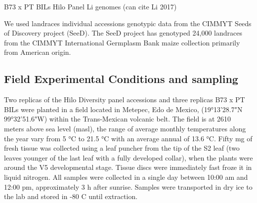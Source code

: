 \documentclass[9pt,twocolumn,twoside,lineno]{gsajnl}
\begin{document}
B73 x PT BILs
Hilo Panel
Li genomes (can cite Li 2017)

We used landraces individual accessions genotypic data from the CIMMYT Seeds of Discovery project (SeeD). The SeeD project has genotyped 24,000 landraces from the  CIMMYT International Germplasm Bank maize collection primarily from American origin.


\subsection{Field Experimental Conditions and sampling} 
Two replicas of the Hilo Diversity panel accessions and three replicas B73 x PT BILs were planted in a field located in Metepec, Edo de Mexico, (19°13'28.7"N 99°32'51.6"W) within the Trans-Mexican volcanic belt. 
The field is at 2610 meters above sea level (masl), the range of average monthly temperatures along the year vary from 5 °C to 21.5 °C with an average annual of 13.6 °C.  
Fifty mg of fresh tissue was collected using a leaf puncher from the tip of the S2 leaf (two leaves younger of the last leaf with a fully developed collar), when the plants were around the V5 developmental stage. 
Tissue discs were immediately fast froze it in liquid nitrogen. All samples were collected in a single day between 10:00 am and 12:00 pm, approximately 3 h after sunrise. 
Samples were transported in dry ice to the lab and stored in -80 C until extraction. 
\end{document}
